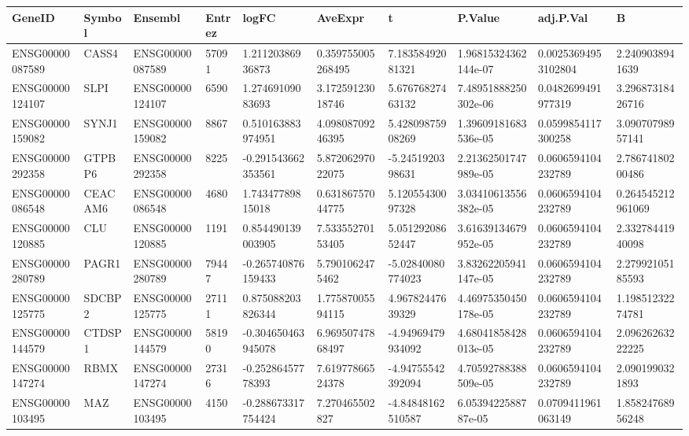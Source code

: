 \begingroup
\tiny
\setlength{\tabcolsep}{2pt}
\renewcommand{\arraystretch}{1.18}
\begin{tabular}{@{}llllllllll@{}}
\toprule
GeneID & Symbol & Ensembl & Entrez & logFC & AveExpr & t & P.Value & adj.P.Val & B \\
\midrule
ENSG00000087589 & CASS4 & ENSG00000087589 & 57091 & 1.21120386936873 & 0.359755005268495 & 7.18358492081321 & 1.96815324362144e-07 & 0.00253694953102804 & 2.2409038941639 \\
ENSG00000124107 & SLPI & ENSG00000124107 & 6590 & 1.27469109083693 & 3.17259123018746 & 5.67676827463132 & 7.48951888250302e-06 & 0.0482699491977319 & 3.29687318426716 \\
ENSG00000159082 & SYNJ1 & ENSG00000159082 & 8867 & 0.510163883974951 & 4.09808709246395 & 5.42809875908269 & 1.39609181683536e-05 & 0.0599854117300258 & 3.09070798957141 \\
ENSG00000292358 & GTPBP6 & ENSG00000292358 & 8225 & -0.291543662353561 & 5.87206297022075 & -5.2451920398631 & 2.21362501747989e-05 & 0.0606594104232789 & 2.78674180200486 \\
ENSG00000086548 & CEACAM6 & ENSG00000086548 & 4680 & 1.74347789815018 & 0.63186757044775 & 5.12055430097328 & 3.03410613556382e-05 & 0.0606594104232789 & 0.264545212961069 \\
ENSG00000120885 & CLU & ENSG00000120885 & 1191 & 0.854490139003905 & 7.53355270153405 & 5.05129208652447 & 3.61639134679952e-05 & 0.0606594104232789 & 2.33278441940098 \\
ENSG00000280789 & PAGR1 & ENSG00000280789 & 79447 & -0.265740876159433 & 5.7901062475462 & -5.02840080774023 & 3.83262205941147e-05 & 0.0606594104232789 & 2.27992105185593 \\
ENSG00000125775 & SDCBP2 & ENSG00000125775 & 27111 & 0.875088203826344 & 1.77587005594115 & 4.96782447639329 & 4.46975350450178e-05 & 0.0606594104232789 & 1.19851232274781 \\
ENSG00000144579 & CTDSP1 & ENSG00000144579 & 58190 & -0.304650463945078 & 6.96950747868497 & -4.94969479934092 & 4.68041858428013e-05 & 0.0606594104232789 & 2.09626263222225 \\
ENSG00000147274 & RBMX & ENSG00000147274 & 27316 & -0.25286457778393 & 7.61977866524378 & -4.94755542392094 & 4.70592788388509e-05 & 0.0606594104232789 & 2.0901990321893 \\
ENSG00000103495 & MAZ & ENSG00000103495 & 4150 & -0.288673317754424 & 7.270465502827 & -4.84848162510587 & 6.0539422588787e-05 & 0.0709411961063149 & 1.85824768956248 \\

\end{tabular}
